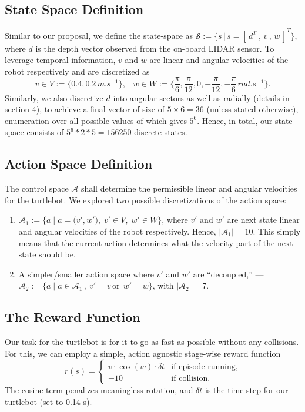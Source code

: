 \documentclass{article}
\begin{document}
\subsection{State Space Definition}
Similar to our proposal, we define the state-space as $\mathcal{S} := \big\{ s\,\big\vert \, s= [\,d^T\:,\,v\,,\,w\,]^T \big\}$, where $d$ is the depth vector observed from the on-board LIDAR sensor. To leverage temporal information, $v$ and $w$ are linear and angular velocities of the robot respectively and are discretized as
\begin{equation*}
  v\in V := \big\{ 0.4, 0.2\,\si{m.s^{-1}}\big\}, \;\;\;w\in W:=\big\{ \frac{\pi}{6}, \frac{\pi}{12}, 0, -\frac{\pi}{12}, -\frac{\pi}{6}\,\si{rad.s^{-1}}\big\}.
\end{equation*}
Similarly, we also discretize $d$ into angular sectors as well as radially (details in section 4), to achieve a final vector of size of $5 \times 6 = 36$ (unless stated otherwise), enumeration over all possible values of which gives $5^6$. Hence, in total, our state space consists of $5^6 * 2 * 5 = 156250$ discrete states.

\subsection{Action Space Definition}
The control space $\mathcal{A}$ shall determine the permissible linear and angular velocities for the turtlebot. We explored two possible discretizations of the action space:
\begin{enumerate}
    \item $\mathcal{A}_1 := \Big\{ a \;\Big\vert\; a = \big(v', w'\big), \;v'\in V, \;w'\in W \Big\}$, where $v'$ and $w'$ are next state linear and angular velocities of the robot respectively. Hence, $\vert \mathcal{A}_1 \vert = 10$. This simply means that the current action determines what the velocity part of the next state should be.
    \item A simpler/smaller action space where $v'$ and $w'$ are ``decoupled,'' --- $\mathcal{A}_2 := \big\{ a\; \big\vert \;a \in \mathcal{A}_1\,,\: v' = v \,\text{or}\,\; w' = w \big\}$, with $\vert \mathcal{A}_2 \vert = 7$. 
\end{enumerate}

\subsection{The Reward Function}
Our task for the turtlebot is for it to go as fast as possible without any collisions. For this, we can employ a simple, action agnostic stage-wise reward function
\begin{equation*}
  r(s) =
  \begin{cases}
    v \cdot \cos(w) \cdot \delta t & \text{if episode running,} \\
    -10 & \text{if collision.}
  \end{cases}
\end{equation*}
The cosine term penalizes meaningless rotation, and $\delta t$ is the time-step for our turtlebot (set to 0.14 s).
\end{document}
